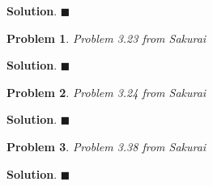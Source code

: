 \documentclass[12pt]{article}
\newtheorem{p}{Problem}
\theoremstyle{definition}
\newenvironment{s}{%
        \begin{trivlist} \item \textbf{Solution}. }{%
            \hspace*{\fill} $\blacksquare$\end{trivlist}}%
\begin{document}
{\begin{s}
\end{s}

\begin{p}
Problem 3.23 from Sakurai
\end{p}

\begin{s}
\end{s}

\begin{p}
Problem 3.24 from Sakurai
\end{p}

\begin{s}
\end{s}

\begin{p}
Problem 3.38 from Sakurai
\end{p}

\begin{s}
\end{s}
\end{document}
